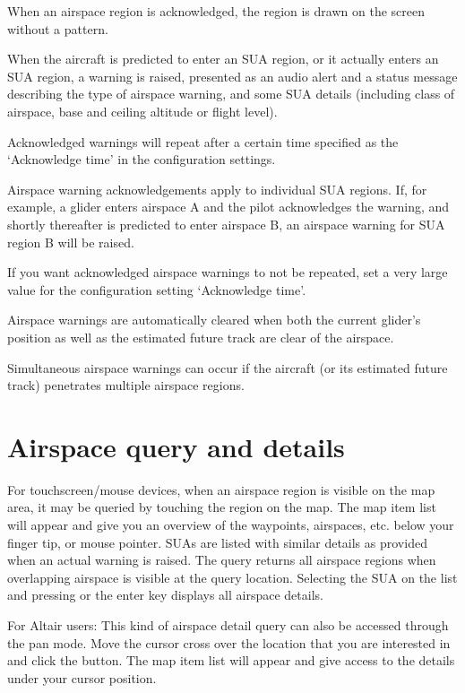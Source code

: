 When an airspace region is acknowledged, the region is drawn on the
screen without a pattern.

When the aircraft is predicted to enter an SUA region, or it actually
enters an SUA region, a warning is raised, presented as an audio alert
and a status message describing the type of airspace warning, and some SUA
details (including class of airspace, base and ceiling altitude or
flight level).

Acknowledged warnings will repeat after a certain time specified as
the `Acknowledge time' in the configuration settings.

Airspace warning acknowledgements apply to individual SUA regions.
If, for example, a glider enters airspace A and the pilot acknowledges
the warning, and shortly thereafter is predicted to enter airspace B,
an airspace warning for SUA region B will be raised.

\tip If you want acknowledged airspace warnings to not be repeated,
set a very large value for the configuration setting `Acknowledge
time'.

Airspace warnings are automatically cleared when both the current
glider's position as well as the estimated future track are clear
of the airspace.

Simultaneous airspace warnings can occur if the aircraft (or its
estimated future track) penetrates multiple airspace regions.

\section{Airspace query and details}

For touchscreen/mouse devices, when an airspace region is visible on
the map area, it may be queried by touching the region on the map.
The map item list will appear and give you an overview of the waypoints,
airspaces, etc. below your finger tip, or mouse pointer.  SUAs are listed with
similar details as provided when an actual warning is raised.
The query returns all airspace regions when overlapping airspace is visible at
the query location.
Selecting the SUA on the list and pressing  or the enter key
displays all airspace details.

\tip For Altair users: This kind of airspace detail query can also be accessed through
the pan mode.  Move the cursor cross over the location that you are interested
in and click the  button.  The map item list will appear
and give access to the details under your cursor position.

